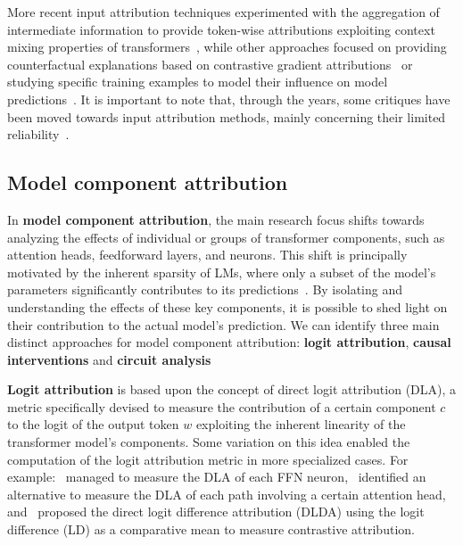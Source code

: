 More recent input attribution techniques experimented with the aggregation of intermediate information to provide token-wise attributions exploiting context mixing properties of transformers~\cite{ferrando2022, modarressi2022, mohebbi2023}, while other approaches focused on providing counterfactual explanations based on contrastive gradient attributions~\cite{yin2022} or studying specific training examples to model their influence on model predictions~\cite{kwon2024, grosse2023}.
It is important to note that, through the years, some critiques have been moved towards input attribution methods, mainly concerning their limited reliability~\cite{sixt2019, adebayo2018, atanasova2020}.

\subsection{Model component attribution}

In \textbf{model component attribution}, the main research focus shifts towards analyzing the effects of individual or groups of transformer components, such as attention heads, feedforward layers, and neurons.
This shift is principally motivated by the inherent sparsity of LMs, where only a subset of the model's parameters significantly contributes to its predictions~\cite{zhao2021}.
By isolating and understanding the effects of these key components, it is possible to shed light on their contribution to the actual model's prediction.
We can identify three main distinct approaches for model component attribution: \textbf{logit attribution}, \textbf{causal interventions} and \textbf{circuit analysis}

\textbf{Logit attribution} is based upon the concept of direct logit attribution (DLA), a metric specifically devised to measure the contribution of a certain component $c$ to the logit of the output token $w$ exploiting the inherent linearity of the transformer model's components.
Some variation on this idea enabled the computation of the logit attribution metric in more specialized cases.
For example:~\citet{geva2022} managed to measure the DLA of each FFN neuron,~\citet{ferrando2023} identified an alternative to measure the DLA of each path involving a certain attention head, and~\citet{wang2023} proposed the direct logit difference attribution (DLDA) using the logit difference (LD) as a comparative mean to measure contrastive attribution.

